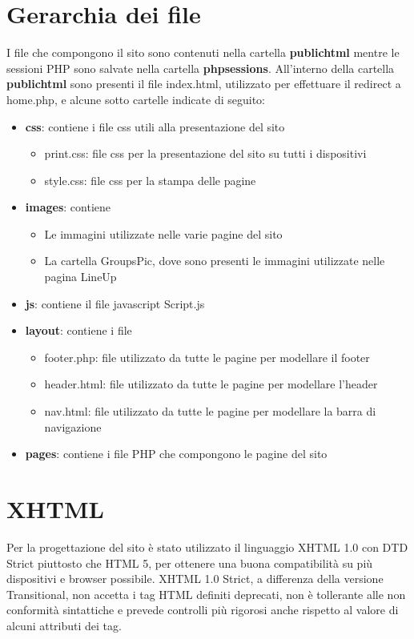 \documentclass[10pt, a4paper]{article}
\begin{document}
\section{Gerarchia dei file}
I file che compongono il sito sono contenuti nella cartella \textbf{public\textunderscore html} mentre le sessioni PHP sono salvate nella cartella \textbf{php\textunderscore sessions}. All'interno della cartella \textbf{public\textunderscore html} sono presenti il file index.html, utilizzato per effettuare il redirect a home.php, e alcune sotto cartelle indicate di seguito:
\begin{itemize}
  \item{\textbf{css}: contiene i file css utili alla presentazione del sito}
    \begin{itemize}
      \item{print.css: file css per la presentazione del sito su tutti i dispositivi}
      \item{style.css: file css per la stampa delle pagine}
    \end{itemize}
  \item{\textbf{images}: contiene}
    \begin{itemize}
       \item{Le immagini utilizzate nelle varie pagine del sito}
        \item{La cartella GroupsPic, dove sono presenti le immagini utilizzate nelle pagina LineUp}
    \end{itemize}
  \item{\textbf{js}: contiene il file javascript Script.js}
  \item{\textbf{layout}: contiene i file }
    \begin{itemize}
       \item{footer.php: file utilizzato da tutte le pagine per modellare il footer}
        \item{header.html: file utilizzato da tutte le pagine per modellare l'header}
        \item{nav.html: file utilizzato da tutte le pagine per modellare la barra di navigazione}
    \end{itemize}
  \item{\textbf{pages}: contiene i file PHP che compongono le pagine del sito}
\end{itemize}
\section{XHTML}
Per la progettazione del sito è stato utilizzato il linguaggio XHTML 1.0 con DTD Strict piuttosto che HTML 5, per ottenere una buona compatibilità su più dispositivi e browser possibile.
XHTML 1.0 Strict, a differenza della versione Transitional, non accetta i tag HTML definiti deprecati, non è tollerante alle non conformità sintattiche e prevede controlli più rigorosi anche rispetto al valore di alcuni attributi dei tag.
\end{document}
